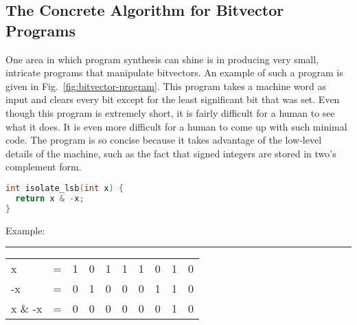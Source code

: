 \begin{figure*}
 \centering
 
 \caption{Abstract synthesis refinement loop
 \label{fig:abstract-refinement}}
\end{figure*}

\iffalse
\subsection{The Concrete Algorithm for Bitvector Programs}
\label{sec:concrete-algorithm}

One area in which program synthesis can shine is in producing very small,
intricate programs that manipulate bitvectors.  An example of such a program
is given in Fig.~\ref{fig:bitvector-program}.  This program takes a machine word
as input and clears every bit except for the least significant bit that was set.
Even though this program is extremely short, it is fairly difficult for a human
to see what it does.  It is even more difficult for a human to come up with such
minimal code.  The program is so concise because it
takes advantage of the low-level details of the machine, such as the fact that
signed integers are stored in two's complement form.

\begin{figure*}
\centering
\begin{minipage}{0.45\linewidth}
 \begin{lstlisting}[language=C]
int isolate_lsb(int x) {
  return x & -x;
}
 \end{lstlisting}
\end{minipage}
\begin{minipage}{0.45\linewidth}
 
Example:

\hrule

\begin{tabular}{llcccccccc}
 x       & = & 1 & 0 & 1 & 1 & 1 & 0 & 1 & 0 \\
 -x      & = & 0 & 1 & 0 & 0 & 0 & 1 & 1 & 0 \\
 x \& -x & = & 0 & 0 & 0 & 0 & 0 & 0 & 1 & 0
\end{tabular}
\end{minipage}


 \caption{A tricky bitvector program}
  \label{fig:bitvector-program}
\end{figure*}


